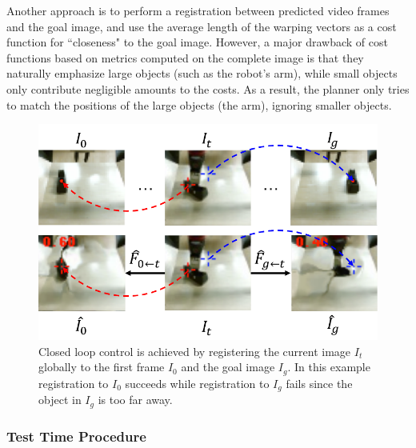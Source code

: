 Another approach is to perform a registration between predicted video frames and the goal image, and use the average length of the warping vectors as a cost function for ``closeness" to the goal image. However, a major drawback of cost functions based on metrics computed on the complete image is that they naturally emphasize large objects (such as the robot's arm), while small objects only contribute negligible amounts to the costs. As a result, the planner only tries to match the positions of the large objects (the arm), ignoring smaller objects.


\begin{figure}

	\centering
	\includegraphics[width=0.8\linewidth]{images_rfr/registration_singletime.pdf}
	\caption{\small{Closed loop control is achieved by registering the current image $I_t$ globally to the first frame $I_0$ and the goal image $I_g$. In this example registration to $I_0$ succeeds while registration to $I_g$ fails since the object in $I_g$ is too far away.}
		\label{fig:reg_single}
	}
\end{figure}

\subsubsection{Test Time Procedure}


